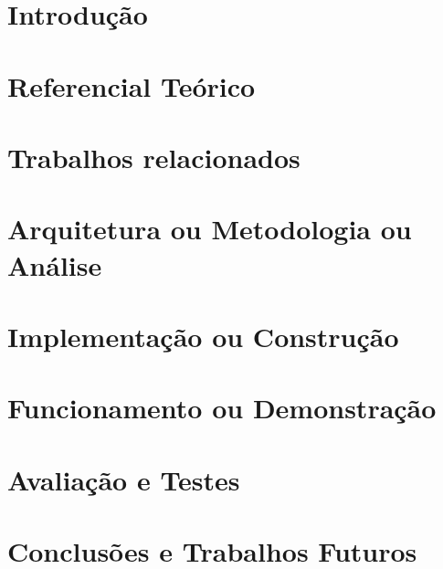 \documentclass[
	12pt,				%
	oneside,
	a4paper,			%
    sumario=tradicional,%
	chapter=TITLE,		%
	english,			%
	french,				%
	spanish,			%
	brazil,				%
	]{abntex2}
\begin{document}
\tableofcontents*
\cleardoublepage



\textual


\chapter[Introdução]{Introdução}\label{cap:introducao}


\chapter{Referencial Teórico}\label{cap:referencial}


\chapter{Trabalhos relacionados}\label{cap:relacionados}



\chapter{Arquitetura ou Metodologia ou Análise}\label{cap:arquitetura}


\chapter{Implementação ou Construção}\label{cap:implementacao}


\chapter{Funcionamento ou Demonstração}\label{cap:funcionamento}


\chapter{Avaliação e Testes}\label{cap:analise}


\chapter{Conclusões e Trabalhos Futuros}\label{cap:conclusao}

\end{document}
